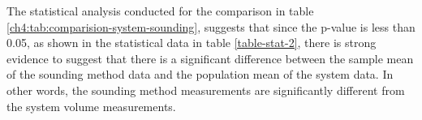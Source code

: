 The statistical analysis conducted for the comparison in table \ref{ch4:tab:comparision-system-sounding}, suggests that since the p-value is less than 0.05, as shown in the statistical data in table \ref{table-stat-2}, there is strong evidence to suggest that there is a significant difference between the sample mean of the sounding method data and the population mean of the system data. In other words, the sounding method measurements are significantly different from the system volume measurements.





